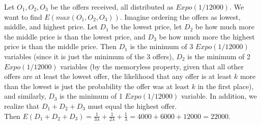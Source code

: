 Let \(O_{1}, O_{2}, O_{3}\) be the offers received, all distributed as \(Expo(1/12000)\). We want to find \(E(max(O_{1},O_{2},O_{3}))\). Imagine ordering the offers as lowest, middle, and highest price. Let \(D_{1}\) be the lowest price, let \(D_{2}\) be how much more the middle price is than the lowest price, and \(D_{3}\) be how much more the highest price is than the middle price. Then \(D_{1}\) is the minimum of 3 \(Expo(1/12000)\) variables (since it is just the minimum of the 3 offers), \(D_{2}\) is the minimum of 2 \(Expo(1/12000)\) variables (by the memoryless property, given that all other offers are at least the lowest offer, the likelihood that any offer is at least \(k\) more than the lowest is just the probability the offer was at least \(k\) in the first place), and similarly, \(D_{3}\) is the minimum of 1 \(Expo(1/12000)\) variable. In addition, we realize that \(D_{1}+D_{2}+D_{3}\) must equal the highest offer.\\

Then \(E(D_{1}+D_{2}+D_{3}) = \frac{1}{3\lambda} + \frac{1}{2\lambda} + \frac{1}{\lambda} = 4000+6000+12000 = 22000 \).
